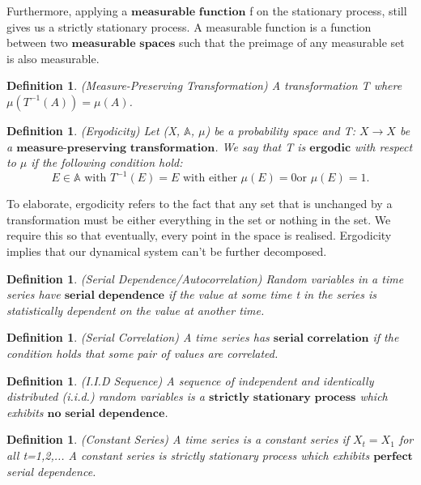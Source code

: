 \documentclass[twoside]{article}
\newtheorem{definition}[theorem]{Definition}
\begin{document}
Furthermore, applying a $\textbf{measurable function}$ f on the stationary process, still gives us a strictly stationary process. A measurable function is a function between two $\textbf{measurable spaces}$ such that the preimage of any measurable set is also measurable. 

\begin{definition}
(Measure-Preserving Transformation) A transformation T where $\mu(T^{-1}(A))  = \mu(A)$.
\end{definition}

\begin{definition}
(Ergodicity) Let (X, $\mathbb{A}$, $\mu$) be a probability space and T: $X \rightarrow X$ be a $\textbf{measure-preserving transformation}$. We say that T is $\textbf{ergodic}$ with respect to $\mu$ if the following condition hold:
$$
  E \in \mathbb{A} \text{ with } T^{-1}(E) = E \text{ with either } \mu(E) = 0 \text{or } \mu(E) = 1. 
$$
\end{definition}

To elaborate, ergodicity refers to the fact that any set that is unchanged by a transformation must be either everything in the set or nothing in the set. We require this so that eventually, every point in the space is realised. Ergodicity implies that our dynamical system can't be further decomposed.

\begin{definition}
(Serial Dependence/Autocorrelation) Random variables in a time series have $\textbf{serial dependence}$ if the value at some time t in the series is statistically dependent on the value at another time.
\end{definition}

\begin{definition}
(Serial Correlation) A time series has $\textbf{serial correlation}$ if the condition holds that some pair of values are correlated.
\end{definition}

\begin{definition}
(I.I.D Sequence) A sequence of independent and identically distributed (i.i.d.) random variables is a $\textbf{strictly stationary process}$ which exhibits $\textbf{no serial dependence}$. 
\end{definition}

\begin{definition}
(Constant Series) A time series is a constant series if $X_t = X_1$ for all t=1,2,... A constant series is strictly stationary process which exhibits $\textbf{perfect}$ serial dependence.
\end{definition}
\end{document}
